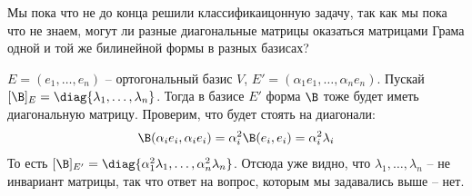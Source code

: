 Мы пока что не до конца решили классификаицонную задачу, так как мы пока что не знаем, могут ли разные диагональные матрицы оказаться матрицами Грама одной и той же 
билинейной формы в разных базисах?

\notice $E = (e_1, \dots, e_n)$ -- ортогональный базис $V$, $E' = (\alpha_1 e_1, \dots, \alpha_n e_n)$. Пускай 
$[\B]_E = \diag{\lambda_1, \dots, \lambda_n}$. Тогда в базисе $E'$ форма $\B$ тоже будет иметь диагональную матрицу. 
Проверим, что будет стоять на диагонали: 
\begin{gather*}
    \B(\alpha_i e_i, \alpha_i e_i) = \alpha_i^2 \B(e_i, e_i) = \alpha_i^2 \lambda_i
\end{gather*}
То есть $[\B]_{E'} = \diag{\alpha_1^2 \lambda_1, \dots, \alpha_n^2 \lambda_n}$. Отсюда уже видно, что $\lambda_1, \dots, \lambda_n$ -- не инвариант матрицы, так что ответ на вопрос, которым
мы задавались выше -- нет. 

